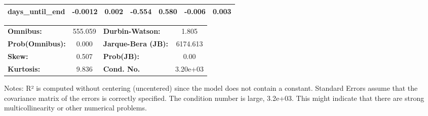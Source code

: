 \begin{center}
\begin{tabular}{lcccccc}
\textbf{days\_until\_end}             &      -0.0012  &        0.002     &    -0.554  &         0.580        &       -0.006    &        0.003     \\
\bottomrule
\end{tabular}
\begin{tabular}{lclc}
\textbf{Omnibus:}       & 555.059 & \textbf{  Durbin-Watson:     } &    1.805  \\
\textbf{Prob(Omnibus):} &   0.000 & \textbf{  Jarque-Bera (JB):  } & 6174.613  \\
\textbf{Skew:}          &   0.507 & \textbf{  Prob(JB):          } &     0.00  \\
\textbf{Kurtosis:}      &   9.836 & \textbf{  Cond. No.          } & 3.20e+03  \\
\bottomrule
\end{tabular}
\end{center}

Notes: \newline
 [1] R² is computed without centering (uncentered) since the model does not contain a constant. \newline
 [2] Standard Errors assume that the covariance matrix of the errors is correctly specified. \newline
 [3] The condition number is large, 3.2e+03. This might indicate that there are \newline
 strong multicollinearity or other numerical problems.